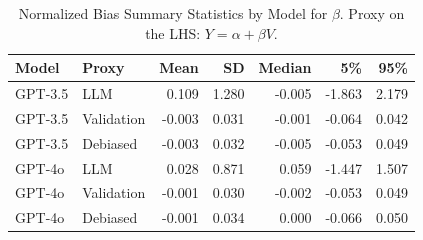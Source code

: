 \begin{table}

\caption{Normalized Bias Summary Statistics by Model for $\beta$. Proxy on the LHS: $Y = \alpha + \beta V$.}
\centering
\begin{tabular}[t]{llrrrrr}
\toprule
Model & Proxy & Mean & SD & Median & 5\% & 95\%\\
\midrule
GPT-3.5 & LLM & 0.109 & 1.280 & -0.005 & -1.863 & 2.179\\
GPT-3.5 & Validation & -0.003 & 0.031 & -0.001 & -0.064 & 0.042\\
GPT-3.5 & Debiased & -0.003 & 0.032 & -0.005 & -0.053 & 0.049\\
GPT-4o & LLM & 0.028 & 0.871 & 0.059 & -1.447 & 1.507\\
GPT-4o & Validation & -0.001 & 0.030 & -0.002 & -0.053 & 0.049\\
GPT-4o & Debiased & -0.001 & 0.034 & 0.000 & -0.066 & 0.050\\
\bottomrule
\end{tabular}
\end{table}

